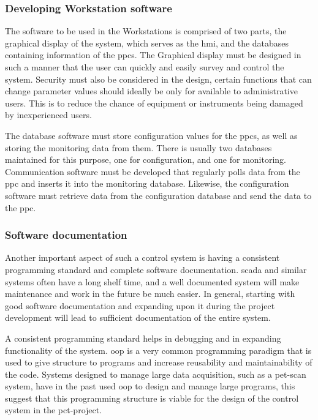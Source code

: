 \documentclass[main.tex]{subfiles}
\begin{document}
\subsubsection{Developing Workstation software}

The software to be used in the Workstations is comprised of two parts, the graphical display of the system, which serves as the \gls{hmi}, and the databases containing information of the \gls{ppc}s. The Graphical display must be designed in such a manner that the user can quickly and easily survey and control the system. Security must also be considered in the design, certain functions that can change parameter values should ideally be only for available to administrative users. This is to reduce the chance of equipment or instruments being damaged by inexperienced users.

The database software must store configuration values for the \gls{ppc}s, as well as storing the monitoring data from them. There is usually two databases maintained for this purpose, one for configuration, and one for monitoring. Communication software must be developed that regularly polls data from the \gls{ppc} and inserts it into the monitoring database. Likewise, the configuration software must retrieve data from the configuration database and send the data to the \gls{ppc}.



\subsubsection{Software documentation}
Another important aspect of such a control system is having a consistent programming standard and complete software documentation. \gls{scada} and similar systems often have a long shelf time, and a well documented system will make maintenance and work in the future be much easier. In general, starting with good software documentation and expanding upon it during the project development will lead to sufficient documentation of the entire system.

A consistent programming standard helps in debugging and in expanding functionality of the system. \gls{oop} is a very common programming paradigm that is used to give structure to programs and increase reusability and maintainability of the code. Systems designed to manage large data acquisition, such as a \gls{pet}-scan system, have in the past used \gls{oop} to design and manage large programs\cite{pet_control_system}, this suggest that this programming structure is viable for the design of the control system in the \gls{pct}-project.
\end{document}
